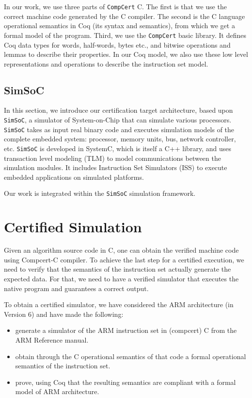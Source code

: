 \documentclass[a4paper, conference]{IEEEtran}
\newcommand{\compcert}{\texttt{CompCert}\xspace}
\newcommand{\simsoc}{\texttt{SimSoC}\xspace}
\newcommand{\compcert}{Compcert\xspace}
\begin{document}
In our work, we use three parts of \compcert C.  The first is that we
use the correct machine code generated by the C compiler.  The second
is the C language operational semantics in Coq (its syntax and
semantics), from which we get a formal model of the program.  Third,
we use the \compcert basic library. It defines Coq data types for words,
half-words, bytes etc., and bitwise operations and lemmas to describe
their properties.  In our Coq model, we also use these low level
representations and operations to describe the instruction set model.

\subsection{SimSoC}

In this section, we introduce our certification target architecture,
based upon \simsoc\cite{helmstetter2008simsoc}, a simulator of
System-on-Chip that can simulate various processors.  \simsoc takes as
input real binary code and executes simulation models of the complete
embedded system: processor, memory units, bus, network controller,
etc.  \simsoc is developed in SystemC, which is itself a C++ library,
and uses transaction level modeling (TLM) to model communications
between the simulation modules. It includes Instruction Set Simulators
(ISS) to execute embedded applications on simulated platforms.

Our work is integrated within the \simsoc simulation framework.


\section{Certified Simulation}
\label{method}

Given an algorithm source code in C, one can obtain the verified
machine code using Compcert-C compiler. To achieve the last step for a
certified execution, we need to verify that the semantics of the
instruction set actually generate the expected data. For that, we need
to have a verified simulator that executes the native program and
guarantees a correct output.

To obtain a certified simulator, we have considered the ARM architecture
(in Version 6) and have made the following:
\begin{itemize}
\item generate a simulator of the ARM instruction set in (compcert) C
  from the ARM Reference manual.
\item obtain through the C operational semantics of that code a formal
  operational semantics of the instruction set.
\item prove, using Coq that the resulting semantics are compliant with
a formal model of ARM architecture.
\end{itemize}
\end{document}
